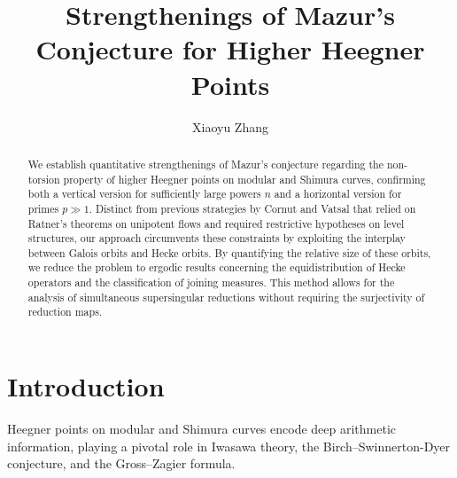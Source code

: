 \documentclass[11pt,oneside,reqno]{amsart}
\theoremstyle{plain}
\begin{document}
	\title{Strengthenings of Mazur's Conjecture for Higher Heegner Points}
	\author{Xiaoyu Zhang}
	\address{Universität Duisburg-Essen,
		Fakultät für Mathematik,
		Mathematikcarrée
		Thea-Leymann-Straße 9,
		45127 Essen,
		Germany}
	
	\begin{abstract}
    We establish quantitative strengthenings of Mazur's conjecture regarding the non-torsion property of higher Heegner points on modular and Shimura curves, confirming both a vertical version for sufficiently large powers $n$ and a horizontal version for primes $p \gg 1$. Distinct from previous strategies by Cornut and Vatsal that relied on Ratner's theorems on unipotent flows and required restrictive hypotheses on level structures, our approach circumvents these constraints by exploiting the interplay between Galois orbits and Hecke orbits. By quantifying the relative size of these orbits, we reduce the problem to ergodic results concerning the equidistribution of Hecke operators and the classification of joining measures. This method allows for the analysis of simultaneous supersingular reductions without requiring the surjectivity of reduction maps.
	\end{abstract}
	
	\maketitle
	
	
	
	\tableofcontents
	
	
	
	
	
	
	

	
	
	
	
	
	
	
	
	

	\section{Introduction}	
	Heegner points on modular and Shimura curves encode deep arithmetic information, playing a pivotal role in Iwasawa theory, the Birch--Swinnerton-Dyer conjecture, and the Gross--Zagier formula.
	
\end{document}
